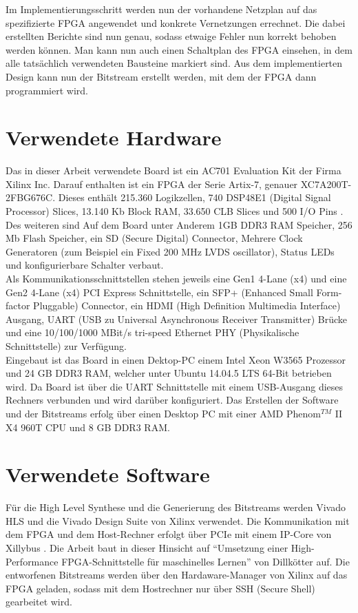 Im Implementierungsschritt werden nun der vorhandene Netzplan auf das spezifizierte FPGA angewendet und konkrete Vernetzungen errechnet. Die dabei erstellten Berichte sind nun genau, sodass etwaige Fehler nun korrekt behoben werden können. Man kann nun auch einen Schaltplan des FPGA einsehen, in dem alle tatsächlich verwendeten Bausteine markiert sind.
Aus dem implementierten Design kann nun der Bitstream erstellt werden, mit dem der FPGA dann programmiert wird.
\section{Verwendete Hardware}
Das in dieser Arbeit verwendete Board ist ein AC701 Evaluation Kit der Firma Xilinx Inc. Darauf enthalten ist ein FPGA der Serie Artix-7, genauer XC7A200T-2FBG676C. Dieses enthält 215.360 Logikzellen, 740 DSP48E1 (Digital Signal Processor) Slices, 13.140 Kb Block RAM, 33.650 CLB Slices und 500 I/O Pins \cite{XIL3}.
\\Des weiteren sind Auf dem Board unter Anderem 1GB DDR3 RAM Speicher, 256 Mb Flash Speicher, ein SD (Secure Digital) Connector, Mehrere Clock Generatoren (zum Beispiel ein Fixed 200 MHz LVDS oscillator), Status LEDs und konfigurierbare Schalter verbaut.\\
Als Kommunikationsschnittstellen stehen jeweils eine Gen1 4-Lane (x4) und eine Gen2 4-Lane (x4) PCI Express Schnittstelle, ein SFP+ (Enhanced Small Form-factor Pluggable) Connector, ein HDMI (High Definition Multimedia Interface) Ausgang, UART (USB zu Universal Asynchronous Receiver Transmitter) Brücke und eine 10/100/1000 MBit/s tri-speed Ethernet PHY (Physikalische Schnittstelle) zur Verfügung\cite{XIL1}.\\
Eingebaut ist das Board in einen Dektop-PC einem Intel Xeon W3565 Prozessor und 24 GB DDR3 RAM, welcher unter Ubuntu 14.04.5 LTS 64-Bit betrieben wird. Da Board ist über die UART Schnittstelle mit einem USB-Ausgang dieses Rechners verbunden und wird darüber konfiguriert.
Das Erstellen der Software und der Bitstreams erfolg über einen Desktop PC mit einer AMD Phenom$^{TM}$ II X4 960T CPU und 8 GB DDR3 RAM.
\section{Verwendete Software}
Für die High Level Synthese und die Generierung des Bitstreams werden Vivado HLS  und die Vivado Design Suite von Xilinx verwendet. Die Kommunikation mit dem FPGA und dem Host-Rechner erfolgt über PCIe mit einem IP-Core von Xillybus \cite{XILLY}. Die Arbeit baut in dieser Hinsicht auf "`Umsetzung einer High-Performance FPGA-Schnittstelle für maschinelles Lernen"' von Dillkötter\cite{DILL} auf. Die entworfenen Bitstreams werden über den Hardaware-Manager von Xilinx auf das FPGA geladen, sodass mit dem Hostrechner nur über SSH (Secure Shell) gearbeitet wird.